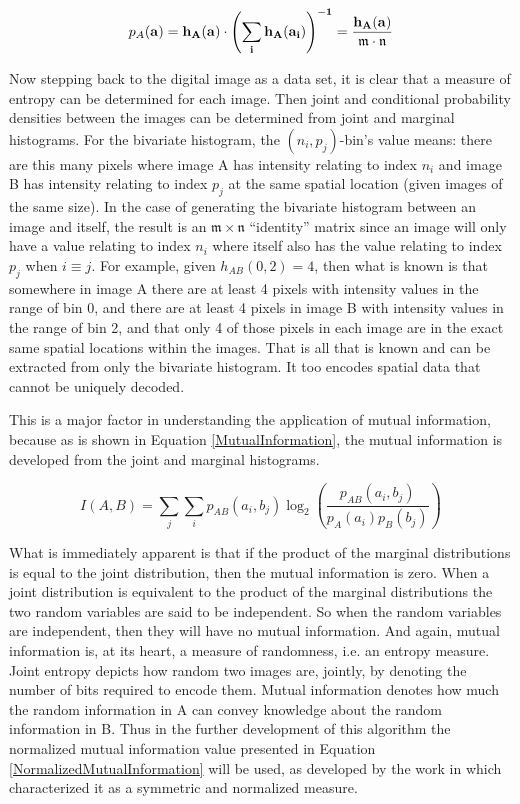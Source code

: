 \begin{equation}
\label{PMF}
	p_{A}(\bf{a})=h_{A}(\bf{a}) \cdot \left(\sum_{i}{h_{A}(a_{i})} \right)^{-1} = \frac{h_{A}(\bf{a})}{\mathfrak{m}\cdot\mathfrak{n}}
\end{equation}


Now stepping back to the digital image as a data set, it is clear that a measure of entropy can be determined for each image. Then joint and conditional probability densities between the images can be determined from joint and marginal histograms. For the bivariate histogram, the $(n_{i},p_{j})${-}bin's value means: there are this many pixels where image A has intensity relating to index $n_{i}$ and image B has intensity relating to index $p_{j}$ at the same spatial location (given images of the same size). In the case of generating the bivariate histogram between an image and itself, the result is an $\mathfrak{m} \times \mathfrak{n}$ ``identity'' matrix since an image will only have a value relating to index $n_{i}$ where itself also has the value relating to index $p_{j}$ when $i \equiv j$. For example, given $h_{AB}(0,2)=4$, then what is known is that somewhere in image A there are at least 4 pixels with intensity values in the range of bin 0, and there are at least 4 pixels in image B with intensity values in the range of bin 2, and that only 4 of those pixels in each image are in the exact same spatial locations within the images. That is all that is known and can be extracted from only the bivariate histogram. It too encodes spatial data that cannot be uniquely decoded.

This is a major factor in understanding the application of mutual information, because as is shown in Equation \ref{MutualInformation}, the mutual information is developed from the joint and marginal histograms.

\begin{equation}
\label{MutualInformation}
	I(A,B) = \sum_{j}{\sum_{i}{p_{AB}(a_{i},b_{j}) \log_{2}{\left( \frac{p_{AB}(a_{i},b_{j})}{p_{A}(a_{i})p_{B}(b_{j})}\right)}}}
\end{equation}

\noindent What is immediately apparent is that if the product of the marginal distributions is equal to the joint distribution, then the mutual information is zero. When a joint distribution is equivalent to the product of the marginal distributions the two random variables are said to be independent. So when the random variables are independent, then they will have no mutual information. And again, mutual information is, at its heart, a measure of randomness, i.e. an entropy measure. Joint entropy depicts how random two images are, jointly, by denoting the number of bits required to encode them. Mutual information denotes how much the random information in A can convey knowledge about the random information in B. Thus in the further development of this algorithm the normalized mutual information value presented in Equation \ref{NormalizedMutualInformation} will be used, as developed by the work in \cite{Yao1999} which characterized it as a symmetric and normalized measure.

